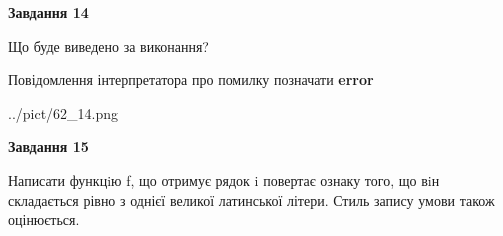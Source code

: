 \documentclass[11pt, ukrainian]{article}
\begin{document}
{\begin {large}
{\begin {center}\textbf{Завдання 14}\end {center}}\par
Що буде виведено за виконання? \par
Повідомлення інтерпретатора про помилку позначати \textbf{error}

\begin{center}
	{../pict/62_14.png}
\end{center}
\newpage

{\begin {center}\textbf{Завдання 15}\end {center}}\par

Написати функцiю f, що отримує рядок i повертає ознаку того, що вiн складається рівно з однієї великої латинської літери. Стиль запису умови також оцінюється.\par
\newpage

\end {large}}
\end{document}

